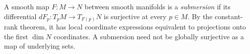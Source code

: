 
A smooth map $F:M\to N$ between smooth manifolds is a \emph{submersion} if its differential $dF_p:T_pM\to T_{F(p)}N$ is surjective at every $p\in M$. By the constant-rank theorem, it has local coordinate expressions equivalent to projections onto the first $\dim N$ coordinates. A submersion need not be globally surjective as a map of underlying sets.

